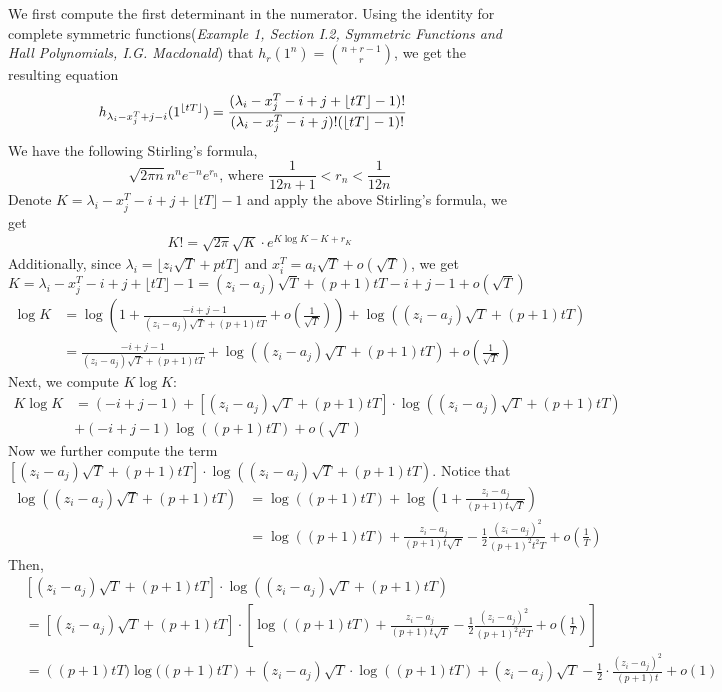 \documentclass[12pt]{article}
\DeclarePairedDelimiter\floor{\lfloor}{\rfloor}
\begin{document}
We first compute the first determinant in the numerator. Using the identity for complete symmetric functions(\emph{Example 1, Section I.2, Symmetric Functions and Hall Polynomials, I.G. Macdonald}) that $h_r(1^n)=\binom{n+r-1}{r}$, we get the resulting equation 
\begin{align*}
h_{\lambda_i-x_j^T+j-i}(1^{\floor{tT}})&=\frac{(\lambda_{i}-x_{j}^{T}-i+j+\lfloor tT \rfloor -1)!}{(\lambda_{i}-x_{j}^{T}-i+j)!(\lfloor tT \rfloor -1)!}
\end{align*}
We have the following Stirling's formula, 
$$\sqrt{2\pi n}n^ne^{-n}e^{r_{n}}\text{, where }\frac{1}{12n+1}<r_{n}<\frac{1}{12n}$$
Denote $K=\lambda_{i}-x_{j}^{T}-i+j+\lfloor tT \rfloor -1$ and apply the above Stirling's formula, we get
\begin{align*}
K!=\sqrt{2\pi}\sqrt{K}\cdot e^{K\log K-K+r_{K}}
\end{align*}
Additionally, since $\lambda_{i}=\lfloor z_{i}\sqrt{T}+ptT\rfloor$ and $x_{i}^{T}= a_{i}\sqrt{T}+o(\sqrt{T})$, we get \[K=\lambda_{i}-x_{j}^{T}-i+j+\lfloor tT \rfloor -1= (z_{i}-a_{j})\sqrt{T} + (p+1)tT-i+j-1+o(\sqrt{T})\]
\begin{align*}
	\log K&=\log\left(1+\frac{-i+j-1}{(z_{i}-a_{j})\sqrt{T}+(p+1)tT}+o(\frac{1}{\sqrt{T}})\right)+\log((z_{i}-a_{j})\sqrt{T}+(p+1)tT)\\
	&=\frac{-i+j-1}{(z_{i}-a_{j})\sqrt{T}+(p+1)tT}+\log((z_{i}-a_{j})\sqrt{T}+(p+1)tT)+o(\frac{1}{\sqrt{T}})
\end{align*}
Next, we compute $K\log K$:
\begin{align*}
K\log K &=\left(-i+j-1\right) + \left[(z_{i}-a_{j})\sqrt{T}+(p+1)tT\right]\cdot \log\left((z_{i}-a_{j})\sqrt{T}+(p+1)tT\right)\\&+(-i+j-1)\log\left((p+1)tT\right)+o(\sqrt{T})
\end{align*}
Now we further compute the term $\left[(z_{i}-a_{j})\sqrt{T}+(p+1)tT\right]\cdot \log\left((z_{i}-a_{j})\sqrt{T}+(p+1)tT\right)$. Notice that
\begin{align*}
	\log\left((z_{i}-a_{j})\sqrt{T}+(p+1)tT\right)&= \log\left((p+1)tT\right)+\log\left(1+\frac{z_{i}-a_{j}}{(p+1)t\sqrt{T}}\right)\\
	&= \log((p+1)tT)+\frac{z_{i}-a_{j}}{(p+1)t\sqrt{T}}-\frac{1}{2}\frac{(z_{i}-a_{j})^2}{(p+1)^{2}t^{2}T}+o(\frac{1}{T})
\end{align*}
Then, 
\begin{align*}
	& \left[(z_{i}-a_{j})\sqrt{T}+(p+1)tT\right]\cdot \log\left((z_{i}-a_{j})\sqrt{T}+(p+1)tT\right)\\
	&=\left[(z_{i}-a_{j})\sqrt{T}+(p+1)tT\right]\cdot \left[\log((p+1)tT)+\frac{z_{i}-a_{j}}{(p+1)t\sqrt{T}}-\frac{1}{2}\frac{(z_{i}-a_{j})^2}{(p+1)^{2}t^{2}T}+o(\frac{1}{T})\right]\\
	&=\left((p+1)tT)\log((p+1)tT\right)+(z_{i}-a_{j})\sqrt{T}\cdot \log((p+1)tT)+(z_{i}-a_{j})\sqrt{T}-\frac{1}{2}\cdot\frac{(z_{i}-a_{j})^2}{(p+1)t}+o(1)
\end{align*}
\end{document}
